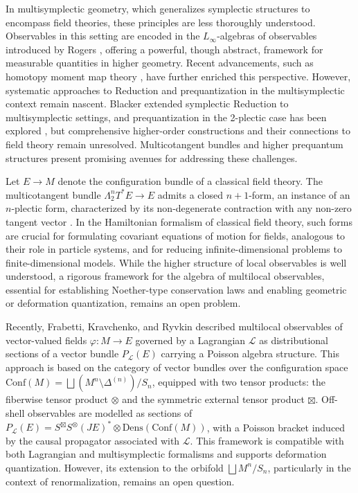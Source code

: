 \documentclass[11pt,a4paper]{article}
\begin{document}
In multisymplectic geometry, which generalizes symplectic structures to encompass field theories, these principles are less thoroughly understood. Observables in this setting are encoded in the $L_\infty$-algebras of observables introduced by Rogers \cite{Rogers2010}, offering a powerful, though abstract, framework for measurable quantities in higher geometry. Recent advancements, such as homotopy moment map theory \cite{Callies2016}, have further enriched this perspective. However, systematic approaches to Reduction and prequantization in the multisymplectic context remain nascent. Blacker \cite{Blacker2020} extended symplectic Reduction to multisymplectic settings, and prequantization in the 2-plectic case has been explored \cite{Rogers2013, Sevestre2021}, but comprehensive higher-order constructions and their connections to field theory remain unresolved. Multicotangent bundles and higher prequantum structures present promising avenues for addressing these challenges.

Let $E \to M$ denote the configuration bundle of a classical field theory. The multicotangent bundle $\Lambda^n_2T^*E \to E$ admits a closed $n+1$-form, an instance of an $n$-plectic form, characterized by its non-degenerate contraction with any non-zero tangent vector \cite{Ryvkin2018, Roman-Roy09}. In the Hamiltonian formalism of classical field theory, such forms are crucial for formulating covariant equations of motion for fields, analogous to their role in particle systems, and for reducing infinite-dimensional problems to finite-dimensional models. While the higher structure of local observables is well understood, a rigorous framework for the algebra of multilocal observables, essential for establishing Noether-type conservation laws and enabling geometric or deformation quantization, remains an open problem.

Recently, Frabetti, Kravchenko, and Ryvkin \cite{Frabetti2024} described multilocal observables of vector-valued fields $\varphi: M \to E$ governed by a Lagrangian $\mathcal{L}$ as distributional sections of a vector bundle $P_{\mathcal{L}}(E)$ carrying a Poisson algebra structure. This approach is based on the category of vector bundles over the configuration space $\mathrm{Conf}(M) = \bigsqcup (M^n \setminus \Delta^{(n)}) / S_n$, equipped with two tensor products: the fiberwise tensor product $\otimes$ and the symmetric external tensor product $\boxtimes$. Off-shell observables are modelled as sections of $P_{\mathcal{L}}(E) = S^{\boxtimes}S^{\otimes}(JE)^* \otimes \mathrm{Dens}(\mathrm{Conf}(M))$, with a Poisson bracket induced by the causal propagator associated with $\mathcal{L}$. This framework is compatible with both Lagrangian and multisymplectic formalisms and supports deformation quantization. However, its extension to the orbifold $\bigsqcup M^n / S_n$, particularly in the context of renormalization, remains an open question.
\end{document}
